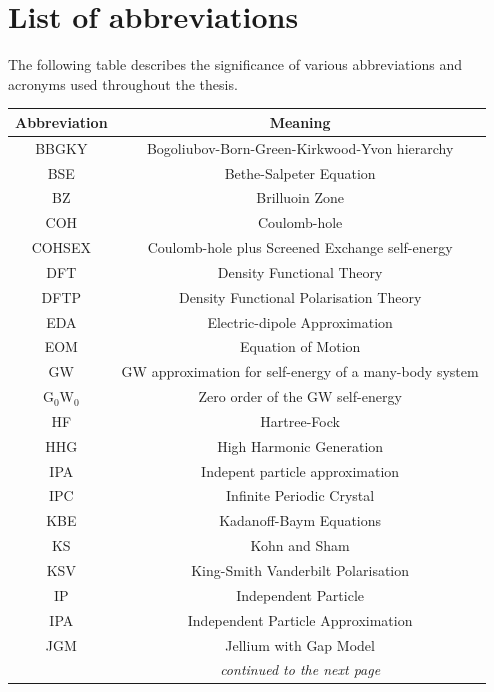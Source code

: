 \chapter*{List of abbreviations}
The following table describes the significance of various abbreviations and acronyms used throughout the thesis.  
\begin{table}[h]
\footnotesize
\begin{tabular}{c|c}
\hline
\textbf{Abbreviation} & \textbf{Meaning} \\
\hline
BBGKY & Bogoliubov-Born-Green-Kirkwood-Yvon hierarchy \\
BSE & Bethe-Salpeter Equation\\
BZ & Brilluoin Zone\\
COH & Coulomb-hole  \\
COHSEX & Coulomb-hole plus Screened Exchange self-energy \\
DFT & Density Functional Theory   \\
DFTP & Density Functional Polarisation Theory   \\
EDA & Electric-dipole Approximation \\
EOM & Equation of Motion   \\
GW & GW approximation for self-energy of a many-body system\\
G$_0$W$_0$ & Zero order of the GW self-energy \\
HF & Hartree-Fock\\
HHG & High Harmonic Generation   \\
IPA & Indepent particle approximation  \\
IPC & Infinite Periodic Crystal  \\
KBE & Kadanoff-Baym Equations\\
KS & Kohn and Sham\\
KSV & King-Smith Vanderbilt Polarisation\\
IP & Independent Particle\\
IPA & Independent Particle Approximation\\
JGM & Jellium with Gap Model\\
    & \emph{continued to the next page}   \\
\end{tabular}
\end{table}


